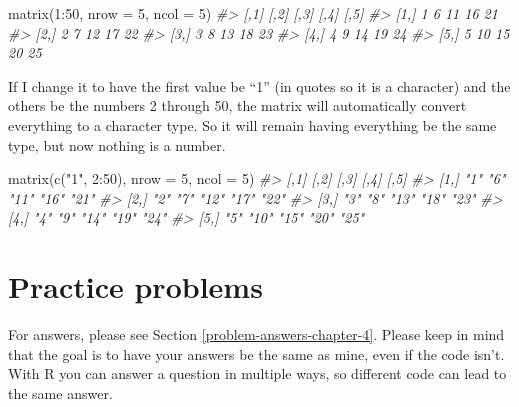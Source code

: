 \documentclass[
]{krantz}
\makeatletter
\newenvironment{Shaded}{\begin{snugshade}}{\end{snugshade}}
\newcommand{\AttributeTok}[1]{\textcolor[rgb]{0.61,0.61,0.61}{#1}}
\newcommand{\CommentTok}[1]{\textcolor[rgb]{0.37,0.37,0.37}{\textit{#1}}}
\newcommand{\DecValTok}[1]{\textcolor[rgb]{0.06,0.06,0.06}{#1}}
\newcommand{\FunctionTok}[1]{\textcolor[rgb]{0,0,0}{#1}}
\newcommand{\NormalTok}[1]{#1}
\newcommand{\SpecialCharTok}[1]{\textcolor[rgb]{0,0,0}{#1}}
\newcommand{\StringTok}[1]{\textcolor[rgb]{0.5,0.5,0.5}{#1}}
\newenvironment{kframe}{%
\medskip{}
\setlength{\fboxsep}{.8em}
 \def\at@end@of@kframe{}%
 \ifinner\ifhmode%
  \def\at@end@of@kframe{\end{minipage}}%
  \begin{minipage}{\columnwidth}%
 \fi\fi%
 \def\FrameCommand##1{\hskip\@totalleftmargin \hskip-\fboxsep
 \colorbox{shadecolor}{##1}\hskip-\fboxsep
     \hskip-\linewidth \hskip-\@totalleftmargin \hskip\columnwidth}%
 \MakeFramed {\advance\hsize-\width
   \@totalleftmargin\z@ \linewidth\hsize
   \@setminipage}}%
 {\par\unskip\endMakeFramed%
 \at@end@of@kframe}
\renewenvironment{Shaded}{\begin{kframe}}{\end{kframe}}
\makeatother
\begin{document}
\begin{Shaded}
\begin{Highlighting}[]
\FunctionTok{matrix}\NormalTok{(}\DecValTok{1}\SpecialCharTok{:}\DecValTok{50}\NormalTok{, }\AttributeTok{nrow =} \DecValTok{5}\NormalTok{, }\AttributeTok{ncol =} \DecValTok{5}\NormalTok{)}
\CommentTok{\#\textgreater{}      [,1] [,2] [,3] [,4] [,5]}
\CommentTok{\#\textgreater{} [1,]    1    6   11   16   21}
\CommentTok{\#\textgreater{} [2,]    2    7   12   17   22}
\CommentTok{\#\textgreater{} [3,]    3    8   13   18   23}
\CommentTok{\#\textgreater{} [4,]    4    9   14   19   24}
\CommentTok{\#\textgreater{} [5,]    5   10   15   20   25}
\end{Highlighting}
\end{Shaded}

If I change it to have the first value be ``1'' (in quotes so it is a character) and the others be the numbers 2 through 50, the matrix will automatically convert everything to a character type. So it will remain having everything be the same type, but now nothing is a number.

\begin{Shaded}
\begin{Highlighting}[]
\FunctionTok{matrix}\NormalTok{(}\FunctionTok{c}\NormalTok{(}\StringTok{"1"}\NormalTok{, }\DecValTok{2}\SpecialCharTok{:}\DecValTok{50}\NormalTok{), }\AttributeTok{nrow =} \DecValTok{5}\NormalTok{, }\AttributeTok{ncol =} \DecValTok{5}\NormalTok{)}
\CommentTok{\#\textgreater{}      [,1] [,2] [,3] [,4] [,5]}
\CommentTok{\#\textgreater{} [1,] "1"  "6"  "11" "16" "21"}
\CommentTok{\#\textgreater{} [2,] "2"  "7"  "12" "17" "22"}
\CommentTok{\#\textgreater{} [3,] "3"  "8"  "13" "18" "23"}
\CommentTok{\#\textgreater{} [4,] "4"  "9"  "14" "19" "24"}
\CommentTok{\#\textgreater{} [5,] "5"  "10" "15" "20" "25"}
\end{Highlighting}
\end{Shaded}

\hypertarget{practice-problems-2}{%
\section{Practice problems}\label{practice-problems-2}}

For answers, please see Section \ref{problem-answers-chapter-4}. Please keep in mind that the goal is to have your answers be the same as mine, even if the code isn't. With R you can answer a question in multiple ways, so different code can lead to the same answer.
\end{document}
